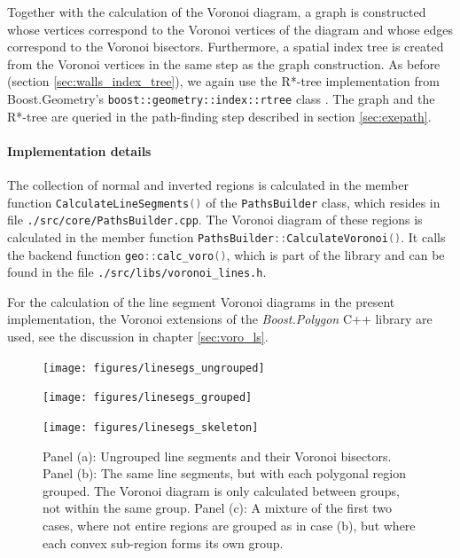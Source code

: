 Together with the calculation of the Voronoi diagram, a graph is constructed whose
vertices correspond to the Voronoi vertices of the diagram and whose edges correspond
to the Voronoi bisectors. 
Furthermore, a spatial index tree is created from the Voronoi vertices in the same 
step as the graph construction.
As before (section \ref{sec:walls_index_tree}), we again use the R*-tree implementation
from Boost.Geometry's \cite{web_boost_geometry} \lstinline[language=C++]|boost::geometry::index::rtree| 
class \cite{web_boost_geometry_rtree}.
The graph and the R*-tree are queried in the path-finding step described in 
section \ref{sec:exepath}.

\paragraph{Implementation details}
The collection of normal and inverted regions is calculated in the member function
\lstinline[language=C++]|CalculateLineSegments()| of the \lstinline[language=C++]|PathsBuilder|
class, which resides in file \lstinline|./src/core/PathsBuilder.cpp|. 
The Voronoi diagram of these regions is calculated in the member function
\lstinline[language=C++]|PathsBuilder::CalculateVoronoi()|.
It calls the backend function \lstinline[language=C++]|geo::calc_voro()|, which is part
of the library and can be found in the file \lstinline|./src/libs/voronoi_lines.h|.

For the calculation of the line segment Voronoi diagrams in the present implementation, 
the Voronoi extensions \cite{web_boost_polygon_voronoi} of the \textit{Boost.Polygon} 
\cite{web_boost_polygon, Simonson2009} C++ library are used, see the discussion in 
chapter \ref{sec:voro_ls}.


\begin{figure}
	\begin{minipage}{0.5 \textwidth}
		\begin{center}
			\texttt{[image: figures/linesegs\_ungrouped]}
		\end{center}
	\end{minipage}
	\begin{minipage}{0.5 \textwidth}
		\begin{center}
			\texttt{[image: figures/linesegs\_grouped]}
		\end{center}
	\end{minipage}
	\vspace{0.25cm}

	\begin{minipage}{0.5 \textwidth}
		\begin{center}
			\texttt{[image: figures/linesegs\_skeleton]}
		\end{center}
	\end{minipage}
	\caption[Voronoi diagrams for polygonal regions.]{
		Panel (a): Ungrouped line segments and their Voronoi bisectors.
		Panel (b): The same line segments, but with each polygonal region grouped.
		The Voronoi diagram is only calculated between groups, not within the same group.
		Panel (c): A mixture of the first two cases, where not entire regions are grouped
		as in case (b), but where each convex sub-region forms its own group.
		\label{fig:linesegs_grouped_voro}}
\end{figure}

